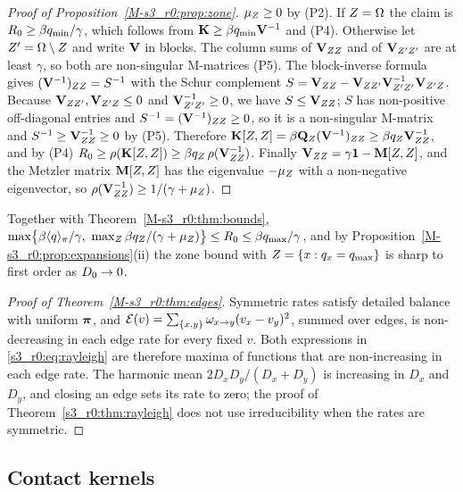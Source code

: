 \begin{proof}[Proof of Proposition~\ref{M-s3_r0:prop:zone}]
  $\mu_Z\ge0$ by (P2).  If $Z=\Omega$ the claim is $R_0\ge\beta q_{\min}/\gamma$, which follows from
  $\mathbf{K}\ge\beta q_{\min}\mathbf{V}^{-1}$ and (P4).  Otherwise let $Z'=\Omega\setminus Z$ and write $\mathbf{V}$ in blocks.  The
  column sums of $\mathbf{V}_{ZZ}$ and of $\mathbf{V}_{Z'Z'}$ are at least $\gamma$, so both are non-singular M-matrices
  (P5).  The block-inverse formula gives $(\mathbf{V}^{-1})_{ZZ}=S^{-1}$ with the Schur complement
  $S=\mathbf{V}_{ZZ}-\mathbf{V}_{ZZ'}\mathbf{V}_{Z'Z'}^{-1}\mathbf{V}_{Z'Z}$.  Because $\mathbf{V}_{ZZ'},\mathbf{V}_{Z'Z}\le0$ and
  $\mathbf{V}_{Z'Z'}^{-1}\ge0$, we have $S\le\mathbf{V}_{ZZ}$; $S$ has non-positive off-diagonal entries and
  $S^{-1}=(\mathbf{V}^{-1})_{ZZ}\ge0$, so it is a non-singular M-matrix and $S^{-1}\ge\mathbf{V}_{ZZ}^{-1}\ge0$ by (P5).
  Therefore $\mathbf{K}[Z,Z]=\beta\mathbf{Q}_Z(\mathbf{V}^{-1})_{ZZ}\ge\beta q_Z\mathbf{V}_{ZZ}^{-1}$, and by (P4)
  $R_0\ge\rho(\mathbf{K}[Z,Z])\ge\beta q_Z\,\rho(\mathbf{V}_{ZZ}^{-1})$.  Finally $\mathbf{V}_{ZZ}=\gamma\mathbf{1}-\mathbf{M}[Z,Z]$, and the
  Metzler matrix $\mathbf{M}[Z,Z]$ has the eigenvalue $-\mu_Z$ with a non-negative eigenvector, so
  $\rho(\mathbf{V}_{ZZ}^{-1})\ge1/(\gamma+\mu_Z)$.
\end{proof}

Together with Theorem~\ref{M-s3_r0:thm:bounds},
$\max\bigl\{\beta\langle q\rangle_{\pi}/\gamma,\ \max_Z\beta q_Z/(\gamma+\mu_Z)\bigr\}\le R_0\le\beta q_{\max}/\gamma$, and by
Proposition~\ref{M-s3_r0:prop:expansions}(ii) the zone bound with $Z=\{x:q_x=q_{\max}\}$ is sharp to first order
as $D_0\to0$.

\begin{proof}[Proof of Theorem~\ref{M-s3_r0:thm:edges}]
  Symmetric rates satisfy detailed balance with uniform $\boldsymbol{\pi}$, and
  $\mathcal{E}(v)=\sum_{\{x,y\}}\omega_{x\to y}(v_x-v_y)^2$, summed over edges, is non-decreasing in each edge rate
  for every fixed $v$.  Both expressions in \eqref{s3_r0:eq:rayleigh} are therefore maxima of functions that
  are non-increasing in each edge rate.  The harmonic mean $2D_xD_y/(D_x+D_y)$ is increasing in $D_x$ and
  $D_y$, and closing an edge sets its rate to zero; the proof of Theorem~\ref{s3_r0:thm:rayleigh} does not use
  irreducibility when the rates are symmetric.
\end{proof}

\subsection{Contact kernels}

